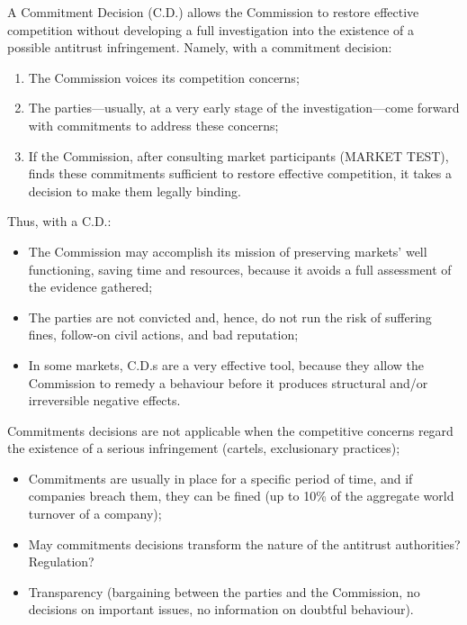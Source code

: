 
    A Commitment Decision (C.D.) allows the Commission to restore effective competition without developing a full investigation into the existence of a possible antitrust infringement. Namely, with a commitment decision:

    \begin{enumerate}
        \item The Commission voices its competition concerns;
        \item The parties—usually, at a very early stage of the investigation—come forward with commitments to address these concerns;
        \item If the Commission, after consulting market participants (MARKET TEST), finds these commitments sufficient to restore effective competition, it takes a decision to make them legally binding.
    \end{enumerate}
    
    Thus, with a C.D.:
    
    \begin{itemize}
        \item The Commission may accomplish its mission of preserving markets' well functioning, saving time and resources, because it avoids a full assessment of the evidence gathered;
        \item The parties are not convicted and, hence, do not run the risk of suffering fines, follow-on civil actions, and bad reputation;
        \item In some markets, C.D.s are a very effective tool, because they allow the Commission to remedy a behaviour before it produces structural and/or irreversible negative effects.
    \end{itemize}

    \noindent Commitments decisions are not applicable when the competitive concerns regard the existence of a serious infringement (cartels, exclusionary practices);

    \begin{itemize}
        \item Commitments are usually in place for a specific period of time, and if companies breach them, they can be fined (up to 10\% of the aggregate world turnover of a company);
        \item May commitments decisions transform the nature of the antitrust authorities? Regulation?
        \item Transparency (bargaining between the parties and the Commission, no decisions on important issues, no information on doubtful behaviour).
    \end{itemize}

